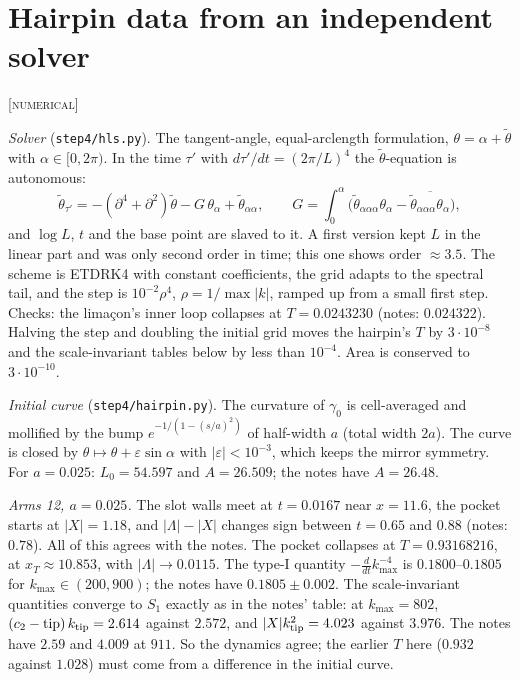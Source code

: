 \documentclass[11pt]{amsart}
\theoremstyle{remark}
\newcommand{\eps}{\varepsilon}
\newcommand{\lab}[1]{\textup{\textsc{[#1]}}}
\begin{document}
\section{Hairpin data from an independent solver}\label{sec:hp}\lab{numerical}

\emph{Solver} (\texttt{step4/hls.py}). The tangent-angle, equal-arclength formulation, $\theta=\alpha+\tilde\theta$ with $\alpha\in[0,2\pi)$. In the time $\tau'$ with $d\tau'/dt=(2\pi/L)^4$ the $\tilde\theta$-equation is autonomous:
\[
\tilde\theta_{\tau'}=-(\partial^4+\partial^2)\tilde\theta-G\,\theta_\alpha+\tilde\theta_{\alpha\alpha},\qquad G=\int_0^\alpha\big(\tilde\theta_{\alpha\alpha\alpha}\theta_\alpha-\overline{\tilde\theta_{\alpha\alpha\alpha}\theta_\alpha}\big),
\]
and $\log L$, $t$ and the base point are slaved to it. A first version kept $L$ in the linear part and was only second order in time; this one shows order $\approx3.5$. The scheme is ETDRK4 with constant coefficients, the grid adapts to the spectral tail, and the step is $10^{-2}\rho^4$, $\rho=1/\max|k|$, ramped up from a small first step. Checks: the limaçon's inner loop collapses at $T=0.0243230$ (notes: $0.024322$). Halving the step and doubling the initial grid moves the hairpin's $T$ by $3\cdot10^{-8}$ and the scale-invariant tables below by less than $10^{-4}$. Area is conserved to $3\cdot10^{-10}$.

\emph{Initial curve} (\texttt{step4/hairpin.py}). The curvature of $\gamma_0$ is cell-averaged and mollified by the bump $e^{-1/(1-(s/a)^2)}$ of half-width $a$ (total width $2a$). The curve is closed by $\theta\mapsto\theta+\eps\sin\alpha$ with $|\eps|<10^{-3}$, which keeps the mirror symmetry. For $a=0.025$: $L_0=54.597$ and $A=26.509$; the notes have $A=26.48$.

\emph{Arms 12, $a=0.025$.} The slot walls meet at $t=0.0167$ near $x=11.6$, the pocket starts at $|X|=1.18$, and $|\Lambda|-|X|$ changes sign between $t=0.65$ and $0.88$ (notes: $0.78$). All of this agrees with the notes. The pocket collapses at $T=0.93168216$, at $x_T\approx10.853$, with $|\Lambda|\to0.0115$. The type-I quantity $-\frac{d}{dt}k_{\max}^{-4}$ is $0.1800$--$0.1805$ for $k_{\max}\in(200,900)$; the notes have $0.1805\pm0.002$. The scale-invariant quantities converge to $S_1$ exactly as in the notes' table: at $k_{\max}=802$, $(c_2-\text{tip})\,k_{\rm tip}=2.614$ against $2.572$, and $|X|k_{\rm tip}^2=4.023$ against $3.976$. The notes have $2.59$ and $4.009$ at $911$. So the dynamics agree; the earlier $T$ here ($0.932$ against $1.028$) must come from a difference in the initial curve.
\end{document}
